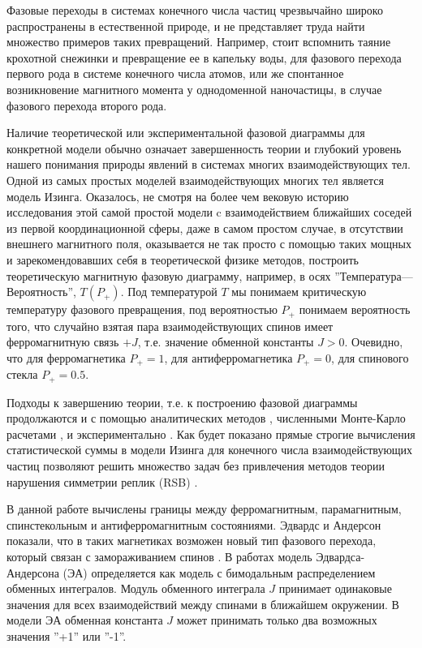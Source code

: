 
{\actuality} Фазовые переходы в системах конечного числа частиц чрезвычайно широко распространены в естественной природе, и не представляет труда найти множество примеров таких превращений. Например, стоит вспомнить таяние крохотной снежинки и превращение ее в капельку воды, для фазового перехода первого рода в системе конечного числа атомов, или же спонтанное возникновение магнитного момента у однодоменной наночастицы, в случае фазового перехода второго рода. 

Наличие теоретической или экспериментальной фазовой диаграммы для конкретной модели обычно означает завершенность теории и глубокий уровень нашего понимания природы явлений в системах многих взаимодействующих тел. Одной из самых простых моделей взаимодействующих многих тел является модель Изинга. Оказалось, не смотря на более чем вековую историю исследования этой самой простой модели c взаимодействием ближайших соседей из первой координационной сферы, даже в самом простом случае, в отсутствии внешнего магнитного поля, оказывается не так просто с помощью таких мощных и зарекомендовавших себя в теоретической физике методов, построить теоретическую магнитную фазовую диаграмму, например, в осях ''Температура---Вероятность'', $T(P_+)$. Под температурой $T$ мы понимаем критическую температуру фазового превращения, под вероятностью $P_+$ понимаем вероятность того, что случайно взятая пара взаимодействующих спинов имеет ферромагнитную связь $+J$, т.е. значение обменной константы $J>0$. Очевидно, что для ферромагнетика $P_+=1$, для антиферромагнетика $P_+=0$, для спинового стекла $P_+=0.5$.

Подходы к завершению теории, т.е. к построению фазовой диаграммы продолжаются и с помощью аналитических методов \cite{belokon2006}, численными Монте-Карло расчетами \cite{Hasenbusch2008}, и экспериментально \cite{Mirebeau2022}. Как будет показано прямые строгие вычисления статистической суммы в модели Изинга для конечного числа взаимодействующих частиц позволяют решить множество задач без привлечения методов теории нарушения симметрии реплик (RSB) \cite{newman2023proof}.

В данной работе вычислены границы между ферромагнитным, парамагнитным, спинстекольным и антиферромагнитным состояниями. Эдвардс и Андерсон показали, что в таких магнетиках возможен новый тип фазового перехода, который связан с замораживанием спинов \cite{edwards1975theory}. В работах \cite{Ground2010pmJ, Correlation2005SG} модель Эдвардса-Андерсона (ЭА) определяется как модель с бимодальным распределением обменных интегралов. Модуль обменного интеграла $J$ принимает одинаковые значения для всех взаимодействий между спинами в ближайшем окружении. В модели ЭА обменная константа $J$ может принимать только два возможных значения ''+1'' или ''-1''. 

